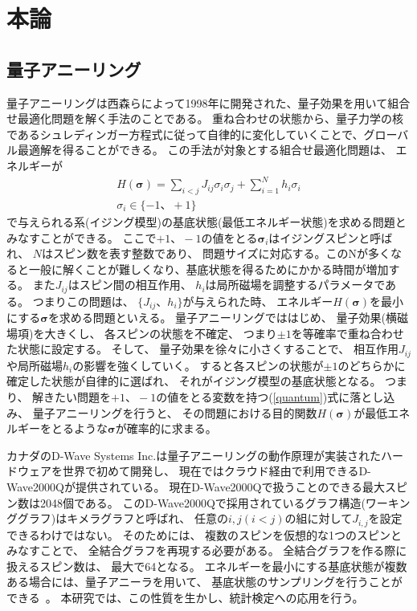 \documentclass[12pt, dvipdfmx]{jmaster}
\theoremstyle{definition}
\begin{document}
\chapter{本論}
\label{sec:propose}
\section{量子アニーリング}
量子アニーリングは西森らによって1998年に開発された、量子効果を用いて組合せ最適化問題を解く手法のことである\cite{kadowaki1998quantum}。
重ね合わせの状態から、量子力学の核であるシュレディンガー方程式に従って自律的に変化していくことで、グローバル最適解を得ることができる。
この手法が対象とする組合せ最適化問題は、 エネルギーが
\begin{eqnarray}
	\label{quantum}
	H(\bm{\sigma}) = \sum_{i<j}J_{ij}\sigma_i \sigma_j + \sum_{i=1}^{N}h_i\sigma_i\\
	\sigma_i \in\{-1、+1\}\nonumber
\end{eqnarray}
で与えられる系(イジング模型)の基底状態(最低エネルギー状態)を求める問題とみなすことができる。
ここで$+1、 -1$の値をとる$\bm{\sigma}_i$はイジングスピンと呼ばれ、 $N$はスピン数を表す整数であり、 
問題サイズに対応する。このNが多くなると一般に解くことが難しくなり、基底状態を得るためにかかる時間が増加する。
また$J_{ij}$はスピン間の相互作用、 $h_i$は局所磁場を調整するパラメータである。
つまりこの問題は、 $\{J_{ij}、 h_i\}$が与えられた時、 エネルギー$H(\bm{\sigma})$を最小にする$\bm{\sigma}$を求める問題といえる。
量子アニーリングでははじめ、 量子効果(横磁場項)を大きくし、 各スピンの状態を不確定、 つまり$\pm1$を等確率で重ね合わせた状態に設定する。
そして、 量子効果を徐々に小さくすることで、 相互作用$J_{ij}$や局所磁場$h_i$の影響を強くしていく。
すると各スピンの状態が$\pm1$のどちらかに確定した状態が自律的に選ばれ、 それがイジング模型の基底状態となる。
つまり、 解きたい問題を$+1、 -1$の値をとる変数を持つ(\ref{quantum})式に落とし込み、 量子アニーリングを行うと、
その問題における目的関数$H(\bm{\sigma})$が最低エネルギーをとるような$\bm{\sigma}$が確率的に求まる。

カナダのD-Wave Systems Inc.は量子アニーリングの動作原理が実装されたハードウェアを世界で初めて開発し、
現在ではクラウド経由で利用できるD-Wave2000Qが提供されている\cite{dwave}。
現在D-Wave2000Qで扱うことのできる最大スピン数は2048個である。 
このD-Wave2000Qで採用されているグラフ構造(ワーキンググラフ)はキメラグラフと呼ばれ、
任意の$i,j(i<j)$の組に対して$J_{i,j}$を設定できるわけではない。
そのためには、 複数のスピンを仮想的な1つのスピンとみなすことで、 全結合グラフを再現する必要がある。
全結合グラフを作る際に扱えるスピン数は、 最大で64となる。
エネルギーを最小にする基底状態が複数ある場合には、量子アニーラを用いて、
基底状態のサンプリングを行うことができる~\cite{mandra2017exponentially}。
本研究では、この性質を生かし、統計検定への応用を行う。
\end{document}
